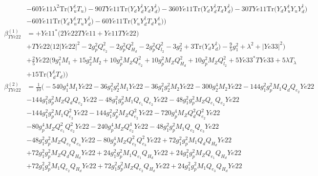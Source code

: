 \begin{align}
 &-60 Ye11 \lambda^{2} \mbox{Tr}\Big({Y_{u}^{\dagger}  T_u}\Big) -90 TYe11 \mbox{Tr}\Big({Y_d  Y_{d}^{\dagger}  Y_d  Y_{d}^{\dagger}}\Big) -360 Ye11 \mbox{Tr}\Big({Y_d  Y_{d}^{\dagger}  T_d  Y_{d}^{\dagger}}\Big) -30 TYe11 \mbox{Tr}\Big({Y_d  Y_{u}^{\dagger}  Y_u  Y_{d}^{\dagger}}\Big) \nonumber \\ 
 &-60 Ye11 \mbox{Tr}\Big({Y_d  Y_{u}^{\dagger}  T_u  Y_{d}^{\dagger}}\Big) -60 Ye11 \mbox{Tr}\Big({Y_u  Y_{d}^{\dagger}  T_d  Y_{u}^{\dagger}}\Big) \Big)\\ 
\beta_{TYe22}^{(1)} & =  
+Ye11^* \Big(2 Ye22 TYe11  + Ye11 TYe22 \Big)\nonumber \\ 
 &+TYe22 \Big(12 |Ye22|^2  -2 g_{p}^{2} Q_{e_{2}}^{2}  -2 g_{p}^{2} Q_{H_d}^{2}  -2 g_{p}^{2} Q_{l_2}^{2}  -3 g_{2}^{2}  + 3 \mbox{Tr}\Big({Y_d  Y_{d}^{\dagger}}\Big)  -\frac{9}{5} g_{1}^{2}  + \lambda^{2} + |Ye33|^2\Big)\nonumber \\ 
 &+\frac{2}{5} Ye22 \Big(9 g_{1}^{2} M_1 +15 g_{2}^{2} M_2 +10 g_{p}^{2} M_Z Q_{e_{2}}^{2} +10 g_{p}^{2} M_Z Q_{H_d}^{2} +10 g_{p}^{2} M_Z Q_{l_2}^{2} +5 Ye33^* TYe33 +5 \lambda T_{\lambda} \nonumber \\ 
 &+15 \mbox{Tr}\Big({Y_{d}^{\dagger}  T_d}\Big) \Big)\\ 
\beta_{TYe22}^{(2)} & =  
\frac{1}{10} \Big(-540 g_{1}^{4} M_1 Ye22 -36 g_{1}^{2} g_{2}^{2} M_1 Ye22 -36 g_{1}^{2} g_{2}^{2} M_2 Ye22 -300 g_{2}^{4} M_2 Ye22 -144 g_{1}^{2} g_{p}^{2} M_1 Q_{d} Q_{e_{2}} Ye22 \nonumber \\ 
 &-144 g_{1}^{2} g_{p}^{2} M_Z Q_{d} Q_{e_{2}} Ye22 -48 g_{1}^{2} g_{p}^{2} M_1 Q_{e_{1}} Q_{e_{2}} Ye22 -48 g_{1}^{2} g_{p}^{2} M_Z Q_{e_{1}} Q_{e_{2}} Ye22 \nonumber \\ 
 &-144 g_{1}^{2} g_{p}^{2} M_1 Q_{e_{2}}^{2} Ye22 -144 g_{1}^{2} g_{p}^{2} M_Z Q_{e_{2}}^{2} Ye22 -720 g_{p}^{4} M_Z Q_{d}^{2} Q_{e_{2}}^{2} Ye22 \nonumber \\ 
 &-80 g_{p}^{4} M_Z Q_{e_{1}}^{2} Q_{e_{2}}^{2} Ye22 -240 g_{p}^{4} M_Z Q_{e_{2}}^{4} Ye22 -48 g_{1}^{2} g_{p}^{2} M_1 Q_{e_{2}} Q_{e_3} Ye22 \nonumber \\ 
 &-48 g_{1}^{2} g_{p}^{2} M_Z Q_{e_{2}} Q_{e_3} Ye22 -80 g_{p}^{4} M_Z Q_{e_{2}}^{2} Q_{e_3}^{2} Ye22 +72 g_{1}^{2} g_{p}^{2} M_1 Q_{d} Q_{H_d} Ye22 \nonumber \\ 
 &+72 g_{1}^{2} g_{p}^{2} M_Z Q_{d} Q_{H_d} Ye22 +24 g_{1}^{2} g_{p}^{2} M_1 Q_{e_{1}} Q_{H_d} Ye22 +24 g_{1}^{2} g_{p}^{2} M_Z Q_{e_{1}} Q_{H_d} Ye22 \nonumber \\ 
 &+72 g_{1}^{2} g_{p}^{2} M_1 Q_{e_{2}} Q_{H_d} Ye22 +72 g_{1}^{2} g_{p}^{2} M_Z Q_{e_{2}} Q_{H_d} Ye22 +24 g_{1}^{2} g_{p}^{2} M_1 Q_{e_3} Q_{H_d} Ye22 \nonumber \\ 

\end{align}
